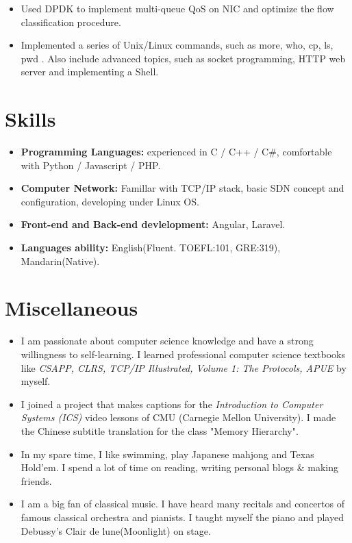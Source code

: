 \documentclass{resume}
\begin{document}
\begin{itemize}
  \item Used DPDK to implement multi-queue QoS on NIC and optimize the flow classification procedure.
\end{itemize}

\begin{itemize}
  \item Implemented a series of Unix/Linux commands, such as more, who, cp, ls, pwd . Also include advanced topics, such as socket programming, HTTP web server and implementing a Shell.
\end{itemize}

\section{Skills}
\begin{itemize}[parsep=0.5ex]
  \item \textbf{Programming Languages:} experienced in C / C++ / C\#, comfortable with Python / Javascript / PHP.
  \item \textbf{Computer Network:} Famillar with TCP/IP stack, basic SDN concept and configuration, developing under Linux OS.
  \item \textbf{Front-end and Back-end devlelopment:} Angular, Laravel.
  \item \textbf{Languages ability:} English(Fluent. TOEFL:101, GRE:319), Mandarin(Native).
\end{itemize}

\section{Miscellaneous}
\begin{itemize}[parsep=0.5ex]
  \item I am passionate about computer science knowledge and have a strong willingness to self-learning. I learned professional computer science textbooks like \textit{CSAPP, CLRS, TCP/IP Illustrated, Volume 1: The Protocols, APUE} by myself.
  \item I joined a project that makes captions for the \textit{Introduction to Computer Systems (ICS)} video lessons of CMU (Carnegie Mellon University). I made the Chinese subtitle translation for the class "Memory Hierarchy".
  \item In my spare time, I like swimming, play Japanese mahjong and Texas Hold'em. I spend a lot of time on reading, writing personal blogs \& making friends.
  \item I am a big fan of classical music. I have heard many recitals and concertos of famous classical orchestra and pianists. I taught myself the piano and played Debussy's Clair de lune(Moonlight) on stage.
\end{itemize}

%
%
\end{document}
